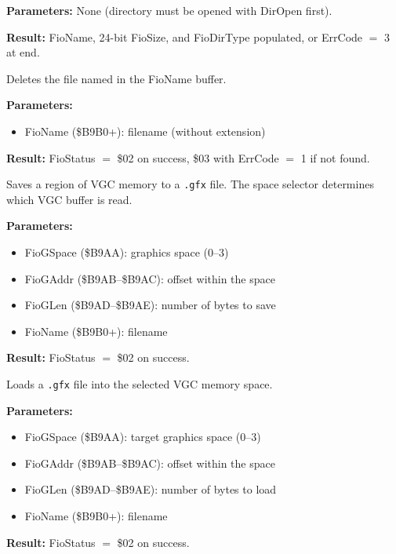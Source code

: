 \textbf{Parameters:} None (directory must be opened with DirOpen first).

\textbf{Result:} FioName, 24-bit FioSize, and FioDirType populated, or
ErrCode $=$ 3 at end.

\medskip


Deletes the file named in the FioName buffer.

\textbf{Parameters:}
\begin{itemize}
  \item FioName (\$B9B0+): filename (without extension)
\end{itemize}

\textbf{Result:} FioStatus $=$ \$02 on success, \$03 with ErrCode $=$ 1 if
not found.

\medskip


Saves a region of VGC memory to a \texttt{.gfx} file.  The space selector
determines which VGC buffer is read.

\textbf{Parameters:}
\begin{itemize}
  \item FioGSpace (\$B9AA): graphics space (0--3)
  \item FioGAddr (\$B9AB--\$B9AC): offset within the space
  \item FioGLen (\$B9AD--\$B9AE): number of bytes to save
  \item FioName (\$B9B0+): filename
\end{itemize}

\textbf{Result:} FioStatus $=$ \$02 on success.

\medskip


Loads a \texttt{.gfx} file into the selected VGC memory space.

\textbf{Parameters:}
\begin{itemize}
  \item FioGSpace (\$B9AA): target graphics space (0--3)
  \item FioGAddr (\$B9AB--\$B9AC): offset within the space
  \item FioGLen (\$B9AD--\$B9AE): number of bytes to load
  \item FioName (\$B9B0+): filename
\end{itemize}

\textbf{Result:} FioStatus $=$ \$02 on success.


